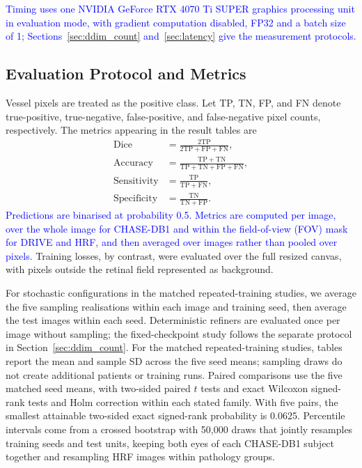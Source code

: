 \documentclass[jimaging,article,submit,pdftex,moreauthors]
  {Definitions/mdpi}
\DeclareRobustCommand{\rev}[1]{\textcolor{blue}{#1}}
\newcommand{\revbegin}{\begingroup\color{blue}}
\DeclareRobustCommand{\rev}[1]{#1}
\newcommand{\revbegin}{\begingroup}
\newcommand{\revend}{\ifhmode\par\fi\endgroup}
\providecommand{\linelabel}[1]{}
\newcommand{\seclabel}[1]{\linelabel{rev:sec:#1}}
\newcommand{\secend}[1]{\linelabel{rev:end:#1}}
\begin{document}
\rev{Timing uses one NVIDIA GeForce RTX 4070 Ti SUPER graphics processing unit in evaluation mode, with gradient computation disabled, FP32 and a batch size of 1; Sections~\ref{sec:ddim_count} and~\ref{sec:latency} give the measurement protocols.}\secend{training}

\subsection{Evaluation Protocol and Metrics}
\label{sec:metrics}
\seclabel{metrics}

Vessel pixels are treated as the positive class. Let TP, TN, FP, and FN denote true-positive, true-negative, false-positive, and false-negative pixel counts, respectively. The metrics appearing in the result tables are
\begin{align}
\mathrm{Dice} &= \frac{2\mathrm{TP}}{2\mathrm{TP}+\mathrm{FP}+\mathrm{FN}}, \\
\mathrm{Accuracy} &= \frac{\mathrm{TP}+\mathrm{TN}}
{\mathrm{TP}+\mathrm{TN}+\mathrm{FP}+\mathrm{FN}}, \\
\mathrm{Sensitivity} &= \frac{\mathrm{TP}}{\mathrm{TP}+\mathrm{FN}}, \\
\mathrm{Specificity} &= \frac{\mathrm{TN}}{\mathrm{TN}+\mathrm{FP}}.
\end{align}
\rev{Predictions are binarised at probability 0.5. Metrics are computed per image, over the whole image for CHASE-DB1 and within the field-of-view (FOV) mask for DRIVE and HRF, and then averaged over images rather than pooled over pixels.} Training losses, by contrast, were evaluated over the full resized canvas, with pixels outside the retinal field represented as background.

\revbegin{}For stochastic configurations in the matched repeated-training studies, we average the five sampling realisations within each image and training seed, then average the test images within each seed. Deterministic refiners are evaluated once per image without sampling; the fixed-checkpoint study follows the separate protocol in Section~\ref{sec:ddim_count}. For the matched repeated-training studies, tables report the mean and sample SD across the five seed means; sampling draws do not create additional patients or training runs. Paired comparisons use the five matched seed means, with two-sided paired $t$ tests and exact Wilcoxon signed-rank tests and Holm correction within each stated family. With five pairs, the smallest attainable two-sided exact signed-rank probability is 0.0625. Percentile intervals come from a crossed bootstrap with 50,000 draws that jointly resamples training seeds and test units, keeping both eyes of each CHASE-DB1 subject together and resampling HRF images within pathology groups.\secend{metrics}\revend{}
\end{document}
